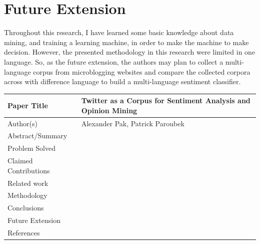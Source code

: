 \documentclass[a4paper,12pt]{article}
\begin{document}
\section*{\textbf{Future Extension}}
Throughout this research, I have learned some basic knowledge about data mining, and training a learning machine, in order to make the machine to make decision. However, the presented methodology in this research were limited in one language. So, as the future extension, the authors may plan to collect a multi-language corpus from microblogging websites and compare the collected corpora across with difference language to build a multi-language sentiment classifier.




\pagebreak
\begin{center}
\begin{tabular}{|m{5cm} | m{10cm} |}
\hline
Paper Title & Twitter as a Corpus for Sentiment Analysis and Opinion Mining\\ \hline
Author(s) & Alexander Pak, Patrick Paroubek\\ \hline
Abstract/Summary & \\ \hline 
Problem Solved & \\ \hline
Claimed Contributions & \\ \hline
Related work & \\ \hline
Methodology & \\ \hline
Conclusions & \\ \hline
Future Extension & \\ \hline
References & \\ \hline 
\end{tabular}
\end{center}
\end{document}

